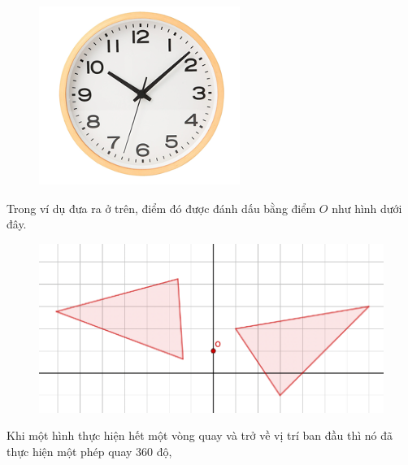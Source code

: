 \begin{multicols}{2}
	\begin{figure}[H]
		\vspace*{-5pt}
		\centering
		\captionsetup{labelformat= empty, justification=centering}
		\includegraphics[width= 1\linewidth]{Picture18}
		\vspace*{-10pt}
	\end{figure}
	Trong ví dụ đưa ra ở trên, điểm đó được đánh dấu bằng điểm $O$ như hình dưới đây.
	\begin{figure}[H]
		\vspace*{-5pt}
		\centering
		\captionsetup{labelformat= empty, justification=centering}
		\includegraphics[width= 1\linewidth]{Picture19}
		\vspace*{-10pt}
	\end{figure}
	Khi một hình thực hiện hết một vòng quay và trở về vị trí ban đầu thì nó đã thực hiện một phép quay $360$ độ, 

\end{multicols}

